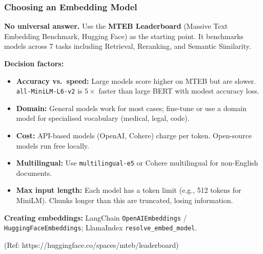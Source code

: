 \begin{frame}[fragile]\frametitle{Choosing an Embedding Model}

\textbf{No universal answer.} Use the \textbf{MTEB Leaderboard} (Massive Text Embedding Benchmark, Hugging Face) as the starting point. It benchmarks models across 7 tasks including Retrieval, Reranking, and Semantic Similarity.

\vspace{0.3em}
\textbf{Decision factors:}
\begin{itemize}
  \item \textbf{Accuracy vs.\ speed:} Large models score higher on MTEB but are slower. \texttt{all-MiniLM-L6-v2} is $5\times$ faster than large BERT with modest accuracy loss.
  \item \textbf{Domain:} General models work for most cases; fine-tune or use a domain model for specialised vocabulary (medical, legal, code).
  \item \textbf{Cost:} API-based models (OpenAI, Cohere) charge per token. Open-source models run free locally.
  \item \textbf{Multilingual:} Use \texttt{multilingual-e5} or Cohere multilingual for non-English documents.
  \item \textbf{Max input length:} Each model has a token limit (e.g., 512 tokens for MiniLM). Chunks longer than this are truncated, losing information.
\end{itemize}

\vspace{0.2em}
\textbf{Creating embeddings:} LangChain \texttt{OpenAIEmbeddings} / \texttt{HuggingFaceEmbeddings}; LlamaIndex \texttt{resolve\_embed\_model}.

{\tiny (Ref: https://huggingface.co/spaces/mteb/leaderboard)}

\end{frame}

